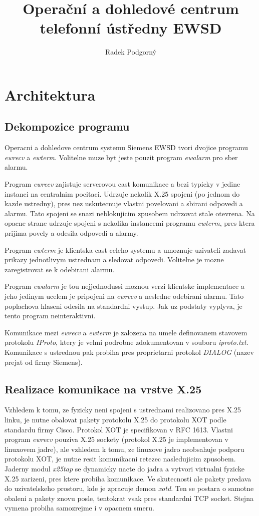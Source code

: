 \documentclass[a4paper,12pt]{article}
\author{Radek Podgorný}
\title{Operační a dohledové centrum telefonní ústředny EWSD}
\date{}
\begin{document}
\maketitle

\section{Architektura}

\subsection{Dekompozice programu}

Operacni a dohledove centrum systemu Siemens EWSD tvori dvojice programu
\emph{ewrecv} a \emph{ewterm}. Volitelne muze byt jeste pouzit program
\emph{ewalarm} pro sber alarmu.

Program \emph{ewrecv} zajistuje serverovou
cast komunikace a bezi typicky v jedine instanci na centralnim pocitaci.
Udrzuje nekolik X.25 spojeni (po jednom do kazde ustredny), pres nez uskutecnuje
vlastni povelovani a sbirani odpovedi a alarmu. Tato spojeni se snazi
neblokujicim zpusobem udrzovat stale otevrena. Na opacne strane udrzuje
spojeni s nekolika instancemi programu \emph{ewterm}, pres ktera prijima povely
a odesila odpovedi a alarmy.

Program \emph{ewterm} je klientska cast celeho systemu a umoznuje uzivateli
zadavat prikazy jednotlivym ustrednam a sledovat odpovedi. Volitelne je mozne
zaregistrovat se k odebirani alarmu.

Program \emph{ewalarm} je tou nejjednodussi moznou verzi klientske implementace
a jeho jedinym ucelem je pripojeni na \emph{ewrecv} a nesledne odebirani alarmu.
Tato poplachova hlaseni odesila na standardni vystup. Jak uz podstaty vyplyva,
je tento program neinteraktivni.

Komunikace mezi \emph{ewrecv} a \emph{ewterm} je zalozena na umele definovanem
stavovem protokolu \emph{IProto}, ktery je velmi podrobne
zdokumentovan v souboru \emph{iproto.txt}. Komunikace s ustrednou pak probiha
pres proprietarni protokol \emph{DIALOG} (nazev prejat od firmy Siemens).

\subsection{Realizace komunikace na vrstve X.25}

Vzhledem k tomu, ze fyzicky neni spojeni s ustrednami realizovano pres X.25
linku, je nutne obalovat pakety protokolu X.25 do protokolu XOT podle standardu
firmy Cisco. Protokol XOT je specifikovan v RFC 1613. Vlastni program
\emph{ewrecv} pouziva X.25 sockety (protokol X.25 je implementovan v linuxovem
jadre), ale vzhledem k tomu, ze linuxove jadro neobsahuje podporu protokolu
XOT, je nutne resit komunikacni retezec nasledujicim zpusobem. Jaderny modul
\emph{x25tap} se dynamicky nacte do jadra a vytvori virtualni fyzicke X.25
zarizeni, pres ktere probiha komunikace. Ve skutecnosti ale pakety predava
do uzivatelskeho prostoru, kde je zpracuje demon \emph{xotd}. Ten se postara
o samotne obaleni a pakety znovu posle, tentokrat vsak pres standardni TCP
socket. Stejna vymena probiha samozrejme i v opacnem smeru.
\end{document}
